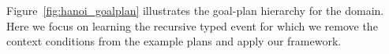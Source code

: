 Figure~\ref{fig:hanoi_goalplan} illustrates the goal-plan hierarchy for the domain. 
Here we focus on learning the recursive typed  event for which we remove the context conditions from the example plans and apply our framework.
%


